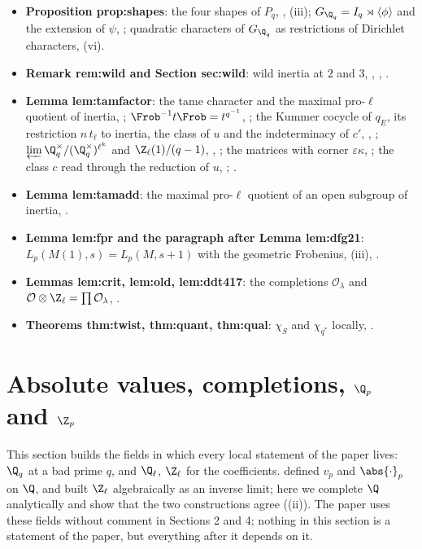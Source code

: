 \begin{itemize}
.
\item \textbf{Proposition prop:shapes}: the four shapes of $P_q$, , (iii); $G_{\Q_q}=I_q\rtimes\langle\phi\rangle$ and the
extension of $\psi$, ; quadratic characters of $G_{\Q_q}$ as restrictions of Dirichlet characters, (vi).
\item \textbf{Remark rem:wild and Section sec:wild}: wild inertia at $2$ and $3$, , , .
\item \textbf{Lemma lem:tamfactor}: the tame character and the maximal pro-$\ell$ quotient of inertia, ; $\Frob^{-1}t\Frob=t^{q^{-1}}$,
; the Kummer cocycle of $q_E$, its restriction $n\,t_\ell$ to inertia, the class of $u$ and the indeterminacy of $c'$,
, ; $\varprojlim\Q_q^\times/(\Q_q^\times)^{\ell^k}$ and $\Z_\ell(1)/(q-1)$, ,
; the matrices with corner $\varepsilon\kappa$, ; the class $c$ read through the reduction of $u$,
; .
\item \textbf{Lemma lem:tamadd}: the maximal pro-$\ell$ quotient of an open subgroup of inertia, .
\item \textbf{Lemma lem:fpr and the paragraph after Lemma lem:dfg21}: $L_p(M(1),s)=L_p(M,s+1)$ with the geometric Frobenius, (iii),
.
\item \textbf{Lemmas lem:crit, lem:old, lem:ddt417}: the completions $\mathcal O_\lambda$ and $\mathcal O\otimes\Z_\ell=\prod\mathcal O_\lambda$, .
\item \textbf{Theorems thm:twist, thm:quant, thm:qual}: $\chi_S$ and $\chi_{q^*}$ locally, .
\end{itemize}

\section{Absolute values, completions, \texorpdfstring{$\Q_p$}{Qp} and \texorpdfstring{$\Z_p$}{Zp}}\label{sec:local:qp}

This section builds the fields in which every local statement of the paper lives: $\Q_q$ at a bad prime $q$, and $\Q_\ell$,
$\Z_\ell$ for the coefficients.  defined $v_p$ and $\abs{\cdot}_p$ on $\Q$, and  built $\Z_\ell$
algebraically as an inverse limit; here we complete $\Q$ analytically and show that the two constructions agree
((ii)). The paper uses these fields without comment in Sections 2 and 4; nothing in this section is a
statement of the paper, but everything after it depends on it.

